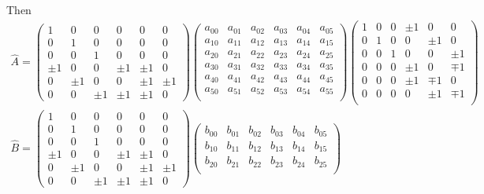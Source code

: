 Then
\begin{gather*} \widehat{A}=\begin{pmatrix}
1 & 0 & 0 & 0 & 0 & 0\\
0 & 1 & 0 & 0 & 0 & 0\\
0 & 0 & 1 & 0 & 0 & 0\\
\pm 1 & 0 & 0 & \pm 1 & \pm 1 & 0\\
0 & \pm 1 & 0 & 0 & \pm 1 & \pm 1\\
0 & 0 & \pm 1 & \pm 1 & \pm 1 & 0
\end{pmatrix}\begin{pmatrix}
a_{00} & a_{01} & a_{02} & a_{03} & a_{04} & a_{05}\\
a_{10} & a_{11} & a_{12} & a_{13} & a_{14} & a_{15}\\
a_{20} & a_{21} & a_{22} & a_{23} & a_{24} & a_{25}\\
a_{30} & a_{31} & a_{32} & a_{33} & a_{34} & a_{35}\\
a_{40} & a_{41} & a_{42} & a_{43} & a_{44} & a_{45}\\
a_{50} & a_{51} & a_{52} & a_{53} & a_{54} & a_{55}\\
\end{pmatrix}\begin{pmatrix}
1 & 0 & 0 & \pm 1 & 0 & 0\\
0 & 1 & 0 & 0 & \pm 1 & 0\\
0 & 0 & 1 & 0 & 0 & \pm 1\\
0 & 0 & 0 & \pm 1 & 0 & \mp 1\\
0 & 0 & 0 & \pm 1 & \mp 1 & 0\\
0 & 0 & 0 & 0 & \pm 1 & \mp 1\\
\end{pmatrix}\\
\widehat{B}=\begin{pmatrix}
1 & 0 & 0 & 0 & 0 & 0\\
0 & 1 & 0 & 0 & 0 & 0\\
0 & 0 & 1 & 0 & 0 & 0\\
\pm 1 & 0 & 0 & \pm 1 & \pm 1 & 0\\
0 & \pm 1 & 0 & 0 & \pm 1 & \pm 1\\
0 & 0 & \pm 1 & \pm 1 & \pm 1 & 0
\end{pmatrix}\begin{pmatrix}
b_{00} & b_{01} & b_{02} & b_{03} & b_{04} & b_{05}\\
b_{10} & b_{11} & b_{12} & b_{13} & b_{14} & b_{15}\\
b_{20} & b_{21} & b_{22} & b_{23} & b_{24} & b_{25}\\

\end{pmatrix}
\end{gather*}
